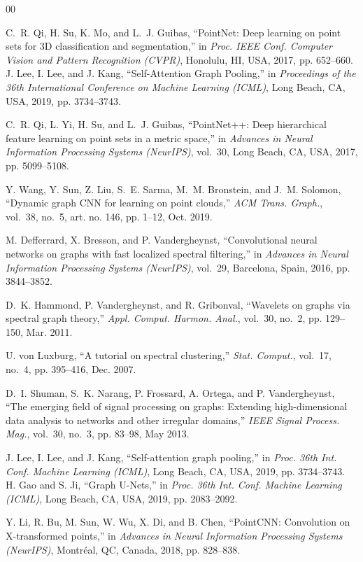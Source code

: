 \documentclass[conference]{IEEEtran}
\begin{document}
\begin{thebibliography}{00}

 C.~R. Qi, H. Su, K. Mo, and L.~J. Guibas, ``PointNet: Deep learning on point sets for 3D classification and segmentation,'' in \emph{Proc. IEEE Conf. Computer Vision and Pattern Recognition (CVPR)}, Honolulu, HI, USA, 2017, pp. 652--660.
 J. Lee, I. Lee, and J. Kang, ``Self-Attention Graph Pooling,'' 
in \emph{Proceedings of the 36th International Conference on Machine Learning (ICML)}, 
Long Beach, CA, USA, 2019, pp. 3734--3743.


 C.~R. Qi, L. Yi, H. Su, and L.~J. Guibas, ``PointNet++: Deep hierarchical feature learning on point sets in a metric space,'' in \emph{Advances in Neural Information Processing Systems (NeurIPS)}, vol.~30, Long Beach, CA, USA, 2017, pp. 5099--5108.

 Y. Wang, Y. Sun, Z. Liu, S.~E. Sarma, M.~M. Bronstein, and J.~M. Solomon, ``Dynamic graph CNN for learning on point clouds,'' \emph{ACM Trans. Graph.}, vol.~38, no.~5, art. no. 146, pp. 1--12, Oct. 2019.

 M. Defferrard, X. Bresson, and P. Vandergheynst, ``Convolutional neural networks on graphs with fast localized spectral filtering,'' in \emph{Advances in Neural Information Processing Systems (NeurIPS)}, vol.~29, Barcelona, Spain, 2016, pp. 3844--3852.

 D.~K. Hammond, P. Vandergheynst, and R. Gribonval, ``Wavelets on graphs via spectral graph theory,'' \emph{Appl. Comput. Harmon. Anal.}, vol.~30, no.~2, pp. 129--150, Mar. 2011.

 U. von Luxburg, ``A tutorial on spectral clustering,'' \emph{Stat. Comput.}, vol.~17, no.~4, pp. 395--416, Dec. 2007.

 D.~I. Shuman, S.~K. Narang, P. Frossard, A. Ortega, and P. Vandergheynst, ``The emerging field of signal processing on graphs: Extending high-dimensional data analysis to networks and other irregular domains,'' \emph{IEEE Signal Process. Mag.}, vol.~30, no.~3, pp. 83--98, May 2013.

 J. Lee, I. Lee, and J. Kang, ``Self-attention graph pooling,'' in \emph{Proc. 36th Int. Conf. Machine Learning (ICML)}, Long Beach, CA, USA, 2019, pp. 3734--3743.
 H. Gao and S. Ji, ``Graph U-Nets,'' in \emph{Proc. 36th Int. Conf. Machine Learning (ICML)}, Long Beach, CA, USA, 2019, pp. 2083--2092.

 Y. Li, R. Bu, M. Sun, W. Wu, X. Di, and B. Chen, ``PointCNN: Convolution on X-transformed points,'' in \emph{Advances in Neural Information Processing Systems (NeurIPS)}, Montréal, QC, Canada, 2018, pp. 828--838.


\end{thebibliography}
\end{document}
